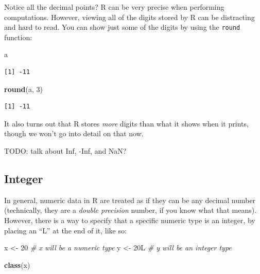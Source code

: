 \documentclass[
]{book}
\newenvironment{Shaded}{\begin{snugshade}}{\end{snugshade}}
\newcommand{\CommentTok}[1]{\textcolor[rgb]{0.56,0.35,0.01}{\textit{#1}}}
\newcommand{\DecValTok}[1]{\textcolor[rgb]{0.00,0.00,0.81}{#1}}
\newcommand{\KeywordTok}[1]{\textcolor[rgb]{0.13,0.29,0.53}{\textbf{#1}}}
\newcommand{\NormalTok}[1]{#1}
\newcommand{\StringTok}[1]{\textcolor[rgb]{0.31,0.60,0.02}{#1}}
\begin{document}
Notice all the decimal points?
R can be very precise when performing computations.
However, viewing all of the digits stored by R can be distracting and hard to read.
You can show just some of the digits by using the \texttt{round} function:

\begin{Shaded}
\begin{Highlighting}[]
\NormalTok{a}
\end{Highlighting}
\end{Shaded}

\begin{verbatim}
[1] -11
\end{verbatim}

\begin{Shaded}
\begin{Highlighting}[]
\KeywordTok{round}\NormalTok{(a, }\DecValTok{3}\NormalTok{)}
\end{Highlighting}
\end{Shaded}

\begin{verbatim}
[1] -11
\end{verbatim}

It also turns out that R stores \emph{more} digits than what it shows when it prints, though we won't go into detail on that now.

TODO: talk about Inf, -Inf, and NaN?

\hypertarget{integer}{%
\subsection{Integer}\label{integer}}

In general, numeric data in R are treated as if they can be any decimal number (technically, they are a \emph{double precision} number, if you know what that means).
However, there is a way to specify that a specific numeric type is an integer, by placing an ``L'' at the end of it, like so:

\begin{Shaded}
\begin{Highlighting}[]
\NormalTok{x <-}\StringTok{ }\DecValTok{20}   \CommentTok{# x will be a numeric type}
\NormalTok{y <-}\StringTok{ }\NormalTok{20L  }\CommentTok{# y will be an integer type}
\end{Highlighting}
\end{Shaded}

\begin{Shaded}
\begin{Highlighting}[]
\KeywordTok{class}\NormalTok{(x)}
\end{Highlighting}
\end{Shaded}
\end{document}

